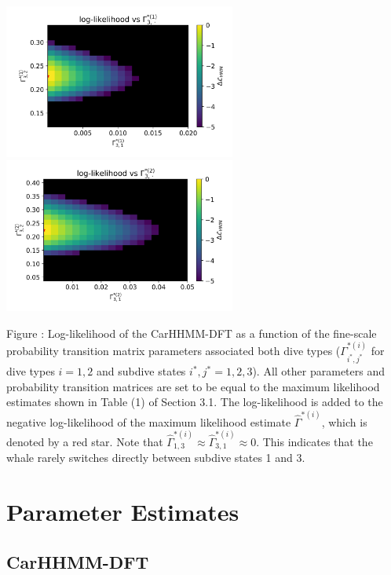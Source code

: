 \documentclass{article}
\begin{document}
\begin{center}
        \includegraphics[width=3in]{../Plots/2019/20190902-182840-CATs_OB_1_0_267_CarHHMM2_fine-gamma-likelihood-0-row_2.png}
        \includegraphics[width=3in]{../Plots/2019/20190902-182840-CATs_OB_1_0_267_CarHHMM2_fine-gamma-likelihood-1-row_2.png}
        \end{center}
        
        \noindent Figure : Log-likelihood of the CarHHMM-DFT as a function of the fine-scale probability transition matrix parameters associated both dive types ($\Gamma^{*(i)}_{i^*,j^*}$ for dive types $i = 1,2$ and subdive states $i^*,j^* = 1,2,3$). All other parameters and probability transition matrices are set to be equal to the maximum likelihood estimates shown in Table (1) of Section 3.1. The log-likelihood is added to the negative log-likelihood of the maximum likelihood estimate $\hat \Gamma^{*(i)}$, which is denoted by a red star. Note that $\hat \Gamma^{*(i)}_{1,3} \approx \hat \Gamma^{*(i)}_{3,1} \approx 0$. This indicates that the whale rarely switches directly between subdive states 1 and 3.
        \addtocounter{fignum}{1}
        
        \newpage    
    
    \section{Parameter Estimates}

        \subsection{CarHHMM-DFT}
        
\end{document}
